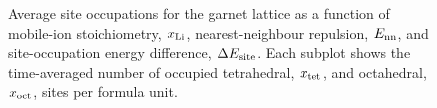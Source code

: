 \documentclass[aps,prb,twocolumn,superscriptaddress,reprint]{revtex4-1}
\newcommand{\xLi}{x_\m{Li}}
\begin{document}
\begin{figure}[tb]
  \centering
    \caption{\label{fig:site_occupation_miniplots}Average site occupations for the garnet lattice as a function of mobile-ion stoichiometry, $\xLi$, nearest-neighbour repulsion, $E_{\mathrm{nn}}$, and site-occupation energy difference, $\Delta E_{\mathrm{site}}$. Each subplot shows the time-averaged number of occupied tetrahedral, $x_{\mathrm{tet}}$, and octahedral, $x_{\mathrm{oct}}$, sites per formula unit.}
\end{figure}
\end{document}
